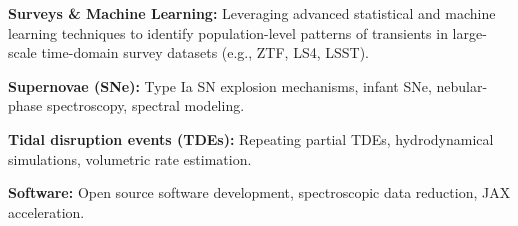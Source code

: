 


\begin{cvpubs}


\cvpub
{ %
\begin{cvitems}
    \item \textbf{\color{darktext}Surveys \& Machine Learning:} Leveraging advanced statistical and machine learning techniques to identify population-level patterns of transients in large-scale time-domain survey datasets (e.g., ZTF, LS4, LSST).
    \item \textbf{\color{darktext}Supernovae (SNe):} Type Ia SN explosion mechanisms, infant SNe, nebular-phase spectroscopy, spectral modeling.
    \item \textbf{\color{darktext}Tidal disruption events (TDEs):} Repeating partial TDEs, hydrodynamical simulations, volumetric rate estimation.
    \item \textbf{\color{darktext}Software:} Open source software development, spectroscopic data reduction, JAX acceleration.
\end{cvitems}
}


\end{cvpubs}